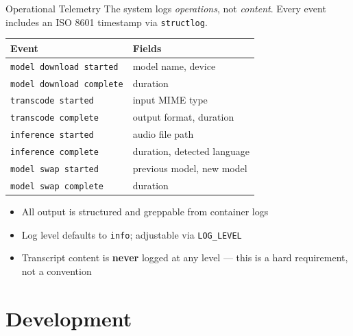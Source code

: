 \documentclass{beamer}
\begin{document}
\begin{frame}{Operational Telemetry}
    The system logs \textit{operations}, not \textit{content}.
    Every event includes an ISO 8601 timestamp via \texttt{structlog}.

    \vspace{0.4em}
    \begin{table}
    \centering
    \scriptsize
    \begin{tabular}{ll}
        \toprule
        \textbf{Event} & \textbf{Fields} \\
        \midrule
        \texttt{model download started}  & model name, device \\
        \texttt{model download complete} & duration \\
        \texttt{transcode started}       & input MIME type \\
        \texttt{transcode complete}      & output format, duration \\
        \texttt{inference started}       & audio file path \\
        \texttt{inference complete}      & duration, detected language \\
        \texttt{model swap started}      & previous model, new model \\
        \texttt{model swap complete}     & duration \\
        \bottomrule
    \end{tabular}
    \end{table}

    \vspace{0.4em}
    \begin{itemize}
        \item All output is structured and greppable from container logs
        \item Log level defaults to \texttt{info}; adjustable via \texttt{LOG\_LEVEL}
        \item Transcript content is \textbf{never} logged at any level ---
              this is a hard requirement, not a convention
    \end{itemize}
\end{frame}


\section{Development}
\end{document}
